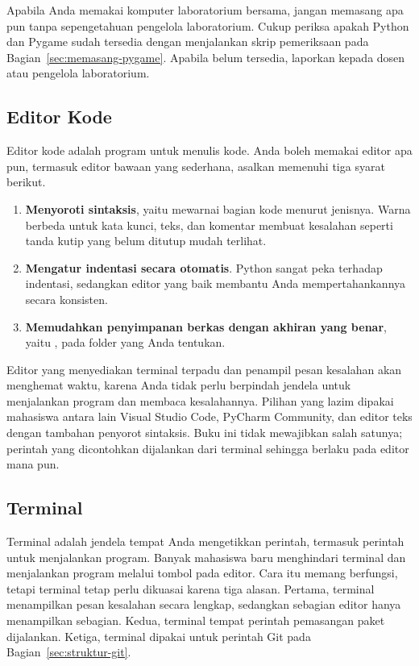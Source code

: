 \begin{catatabox}
Apabila Anda memakai komputer laboratorium bersama, jangan memasang apa pun
tanpa sepengetahuan pengelola laboratorium. Cukup periksa apakah Python dan
Pygame sudah tersedia dengan menjalankan skrip pemeriksaan pada
Bagian~\ref{sec:memasang-pygame}. Apabila belum tersedia, laporkan kepada
dosen atau pengelola laboratorium.
\end{catatabox}

\subsection{Editor Kode}

Editor kode adalah program untuk menulis kode. Anda boleh memakai editor apa
pun, termasuk editor bawaan yang sederhana, asalkan memenuhi tiga syarat
berikut.

\begin{enumerate}
  \item \textbf{Menyoroti sintaksis}, yaitu mewarnai bagian kode menurut
        jenisnya. Warna berbeda untuk kata kunci, teks, dan komentar membuat
        kesalahan seperti tanda kutip yang belum ditutup mudah terlihat.
  \item \textbf{Mengatur indentasi secara otomatis}. Python sangat peka
        terhadap indentasi, sedangkan editor yang baik membantu Anda
        mempertahankannya secara konsisten.
  \item \textbf{Memudahkan penyimpanan berkas dengan akhiran yang benar},
        yaitu , pada folder yang Anda tentukan.
\end{enumerate}

Editor yang menyediakan terminal terpadu dan penampil pesan kesalahan akan
menghemat waktu, karena Anda tidak perlu berpindah jendela untuk menjalankan
program dan membaca kesalahannya. Pilihan yang lazim dipakai mahasiswa antara
lain Visual Studio Code, PyCharm Community, dan editor teks dengan tambahan
penyorot sintaksis. Buku ini tidak mewajibkan salah satunya; perintah yang
dicontohkan dijalankan dari terminal sehingga berlaku pada editor mana pun.

\subsection{Terminal}

Terminal adalah jendela tempat Anda mengetikkan perintah, termasuk perintah
untuk menjalankan program. Banyak mahasiswa baru menghindari terminal dan
menjalankan program melalui tombol pada editor. Cara itu memang berfungsi,
tetapi terminal tetap perlu dikuasai karena tiga alasan. Pertama, terminal
menampilkan pesan kesalahan secara lengkap, sedangkan sebagian editor hanya
menampilkan sebagian. Kedua, terminal tempat perintah pemasangan paket
dijalankan. Ketiga, terminal dipakai untuk perintah Git pada
Bagian~\ref{sec:struktur-git}.

